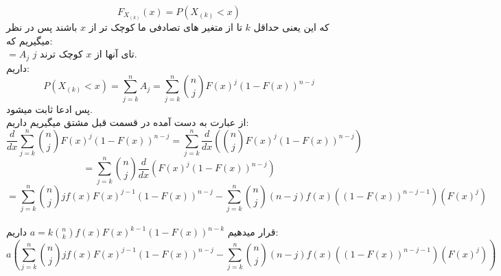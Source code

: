 \parte{}
\[
  F_{X_{(k)}}(x) = P(X_{(k)}<x)  
\]
که این یعنی حداقل $k$ تا از متغیر های تصادفی ما کوچک تر از $x$ باشند
پس در نظر میگیریم که:\\
$ = A_j$ 
 $j$ تای آنها از 
$x$ کوچک ترند.\\
داریم:\\
\[
    P(X_{(k)}<x) = \sum_{j=k}^{n}{A_j}
    = \sum_{j=k}^{n}{\binom{n}{j}{F(x)}^j(1-F(x))^{n-j}}
\]
پس ادعا ثابت میشود.\\

\parte{}
از عبارت به دست آمده در قسمت قبل مشتق میگیریم داریم:\\
\[
    \frac{d}{dx}{\sum_{j = k}^{n}{\binom{n}{j}{F(x)}^j(1-F(x))^{n-j}}}
    = {\sum_{j = k}^{n}{\frac{d}{dx}(\binom{n}{j}{F(x)}^j(1-F(x))^{n-j})}}
\]
\[
    = {\sum_{j = k}^{n}{\binom{n}{j}\frac{d}{dx}({F(x)}^j(1-F(x))^{n-j})}} 
\]
\[
    = \sum_{j = k}^{n}{\binom{n}{j}
    {{jf(x)F(x)}^{j-1}(1-F(x))^{n-j}}} - 
    \sum_{j = k}^{n}{\binom{n}{j}
    {(n-j)f(x)((1-F(x))^{n-j-1})(F(x)^j)}}
\]\\
قرار میدهیم $a = k\binom{n}{k}f(x)F(x)^{k-1}(1-F(x))^{n-k} $
داریم:\\
\[
    a
    (\sum_{j = k}^{n}{\binom{n}{j}
    {{jf(x)F(x)}^{j-1}(1-F(x))^{n-j}}}-
    \sum_{j = k}^{n}{\binom{n}{j}
    {(n-j)f(x)((1-F(x))^{n-j-1})(F(x)^j)}}
    )
\]\\\\
